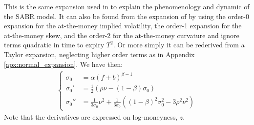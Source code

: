 \documentclass[]{rAMF2e}
\begin{document}
This is the same expansion used in \citep[equation (3.1a)]{hagan2002managing} to explain the phenomenology and dynamic of the SABR model. It can also be found from the expansion of \citep{lorig2014implied} by using the order-0 expansion for the at-the-money implied volatility, the order-1 expansion for the at-the-money skew, and the order-2 for the at-the-money curvature and ignore terms quadratic in time to expiry $T^2$. Or more simply it can be rederived from a Taylor expansion, neglecting higher order terms as in Appendix \ref{apx:normal_expansion}. We have then:
\begin{align}
\begin{cases}
\sigma_0 &= \alpha(f+b)^{\beta-1}\\
\sigma_0' &= \frac{1}{2}\left(\rho \nu - (1-\beta)\sigma_0\right)\\
\sigma_0'' &= \frac{1}{3\sigma_0}\nu^2+\frac{1}{6\sigma_0}\left((1-\beta)^2\sigma_0^2 - 3\rho^2\nu^2\right)
\end{cases}
\end{align} 
Note that the derivatives are expressed on log-moneyness, $z$.
\end{document}
